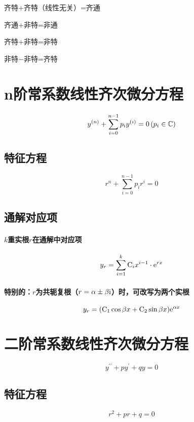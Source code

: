 \documentclass{article}
\begin{document}
齐特+齐特（线性无关）=齐通

齐通+非特=非通

齐特+非特=非特

非特$-$非特=齐特

\section{n阶常系数线性齐次微分方程}

\begin{definition}[]
    \[y^{\left(n\right)}+\sum_{i=0}^{n-1}p_iy^{\left(i\right)}=0\left(p_i\in\mathbb C\right)\]
\end{definition}

\subsection{特征方程}

\[r^n+\sum_{i=0}^{n-1}p_ir^i=0\]

\subsection{通解对应项}

\paragraph{$k$重实根$r$在通解中对应项}

\[y_r=\sum_{i=1}^k\mathrm C_ix^{i-1}\cdot\mathrm e^{rx}\]

\paragraph{特别的：$r$为共轭复根（$r=\alpha\pm\beta\mathrm i$）时，可改写为两个实根}

\[y_r=(\mathrm C_1\cos{\beta x}+\mathrm C_2\sin{\beta x})\mathrm e^{\alpha x}\]

\section{二阶常系数线性齐次微分方程}

\begin{definition}[]
    \[y^{\prime\prime}+py^\prime+qy=0\]
\end{definition}

\subsection{特征方程}

\[r^2+pr+q=0\]
\end{document}
